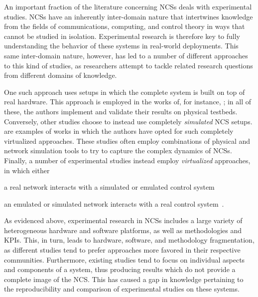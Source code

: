 An important fraction of the literature concerning \acp{NCS} deals with experimental studies.
\acp{NCS} have an inherently inter-domain nature that intertwines knowledge from the fields of communications, computing, and control theory in ways that cannot be studied in isolation.
Experimental research is therefore key to fully understanding the behavior of these systems in real-world deployments.
This same inter-domain nature, however, has led to a number of different approaches to this kind of studies, as researchers attempt to tackle related research questions from different domains of knowledge.

One such approach uses setups in which the complete system is built on top of real hardware.
This approach is employed in the works of, for instance, \textcite{Li2014Wireless,Baumann2018LowPower,Cuenca2019UAV}; in all of these, the authors implement and validate their results on physical testbeds.
Conversely, other studies choose to instead use completely \emph{simulated} \ac{NCS} setups.
\textcite{Wu2012NPC,Chen2015synccontrol,Ma2019DynamicSched} are examples of works in which the authors have opted for such completely virtualized approaches.
These studies often employ combinations of physical and network simulation tools to try to capture the complex dynamics of \acp{NCS}.
Finally, a number of experimental studies instead employ \emph{virtualized} approaches, in which either
\begin{enumerate*}[itemjoin={{; }}, itemjoin*={{; or }}]
    \item a real network interacts with a simulated or emulated control system~\cite{Wang2020VoltageControl}
    \item an emulated or simulated network interacts with a real control system~\cite{Natale2004InvPendEthernet}.
\end{enumerate*}

As evidenced above, experimental research in \acp{NCS} includes a large variety of heterogeneous hardware and software platforms, as well as methodologies and \aclp*{KPI}.
This, in turn, leads to hardware, software, and methodology fragmentation, as different studies tend to prefer approaches more favored in their respective communities.
Furthermore, existing studies tend to focus on individual aspects and components of a system, thus producing results which do not provide a complete image of the \ac{NCS}.
This has caused a gap in knowledge pertaining to the reproducibility and comparison of experimental studies on these systems.

